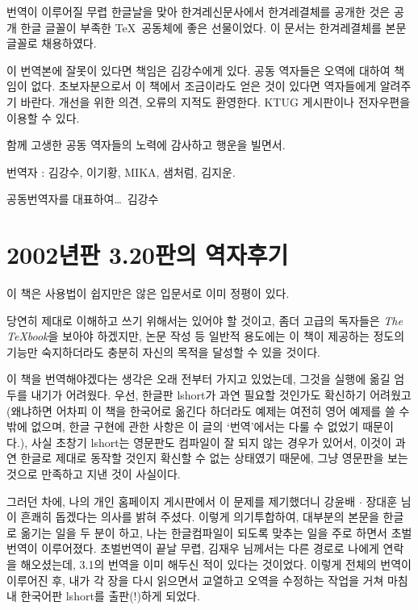 번역이 이루어질 무렵 한글날을 맞아 한겨레신문사에서 한겨레결체를 공개한 것은
공개 한글 글꼴이 부족한 \TeX\ 공동체에 좋은 선물이었다. 이 문서는
한겨레결체를 본문 글꼴로 채용하였다.

이 번역본에 잘못이 있다면 책임은 김강수에게 있다. 공동 역자들은 오역에
대하여 책임이 없다. 초보자분으로서 이 책에서 조금이라도 얻은 것이 있다면
역자들에게 알려주기 바란다. 개선을 위한 의견, 오류의 지적도 환영한다.
KTUG 게시판이나 전자우편을 이용할 수 있다.

함께 고생한 공동 역자들의 노력에 감사하고 행운을 빌면서.

\bigskip
번역자 : 김강수, 이기황, MIKA, 샘처럼, 김지운.

\begin{flushright}
공동번역자를 대표하여\ldots\ 김강수
\end{flushright}

\section*{2002년판 3.20판의 역자후기}
\setcounter{table}{0}
\setcounter{footnote}{0}

이 책은 사용법이 쉽지만은 않은  입문서로 이미 정평이 있다.

당연히  제대로 이해하고 쓰기 위해서는  있어야 할 것이고,
좀더 고급의 독자들은 \emph{The \TeX{}book}을 보아야 하겠지만, 
논문 작성 등 일반적 용도에는 이 책이 제공하는 정도의 기능만 
숙지하더라도 충분히 자신의 목적을 달성할 수 있을 것이다.

이 책을 번역해야겠다는 생각은 오래 전부터 가지고 있었는데,
그것을 실행에 옮길 엄두를 내기가 어려웠다.
우선, 한글판 lshort가 과연 필요할 것인가도 확신하기 어려웠고(왜냐하면 어차피 이 책을 한국어로 옮긴다 하더라도 예제는 여전히 영어 예제를 쓸 수밖에 없으며, 한글 구현에 관한 사항은 이 글의 `번역'에서는 다룰 수
없었기 때문이다.), 사실 초창기 lshort는
영문판도 컴파일이 잘 되지 않는 경우가 있어서, 이것이 과연 한글로
제대로 동작할 것인지 확신할 수 없는 상태였기 때문에,
그냥 영문판을 보는 것으로 만족하고 지낸 것이 사실이다.

그러던 차에, 나의 개인 홈페이지
게시판에서 이 문제를 제기했더니 강윤배 $\cdot$ 장대훈 님이 흔쾌히 돕겠다는 의사를 밝혀 주셨다.
이렇게 의기투합하여, 대부분의 본문을
한글로 옮기는 일을 두 분이 하고, 나는 한글 컴파일이 되도록
맞추는 일을 주로 하면서 초벌번역이 이루어졌다.
초벌번역이 끝날 무렵, 김재우 님께서는 다른 경로로 나에게 연락을 
해오셨는데, 3.1의 번역을 이미 해두신 적이 있다는 것이었다.
이렇게 전체의 번역이 이루어진 후, 내가 각 장을 다시 읽으면서
교열하고 오역을 수정하는 작업을 거쳐 마침내 한국어판 lshort를
출판(!)하게 되었다.

